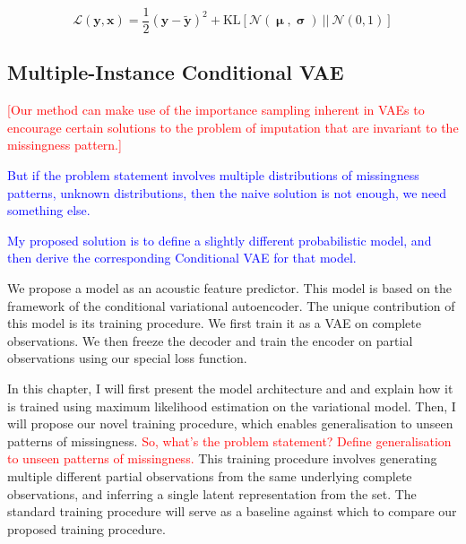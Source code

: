 \documentclass[a4paper,12pt,twoside,openright]{article}
\newcommand{\crit}[1]{\textcolor{red}{#1}}
\newcommand{\draft}[1]{\textcolor{blue}{#1}}
\begin{document}
\[
    \mathcal{L}(\mathbf{y}, \mathbf{x}) = \frac{1}{2} (\mathbf{y} - \tilde{\mathbf{y}})^2 + \mathrm{KL} [\mathcal{N}(\boldsymbol{\upmu}, \boldsymbol{\upsigma}) ~||~ \mathcal{N}(0,1)]
\]

\subsection{Multiple-Instance Conditional VAE}

\crit{[Our method can make use of the importance sampling inherent in VAEs to encourage certain solutions to the problem of imputation that are invariant to the missingness pattern.]}

\draft{But if the problem statement involves multiple distributions of missingness patterns, unknown distributions, then the naive solution is not enough, we need something else.}

\draft{My proposed solution is to define a slightly different probabilistic model, and then derive the corresponding Conditional VAE for that model.}

We propose a model as an acoustic feature predictor. This model is based on the framework of the conditional variational autoencoder. The unique contribution of this model is its training procedure. We first train it as a VAE on complete observations. We then freeze the decoder and train the encoder on partial observations using our special loss function.

In this chapter, I will first present the model architecture and and explain how it is trained using maximum likelihood estimation on the variational model.  Then, I will propose our novel training procedure, which enables generalisation to unseen patterns of missingness. \crit{So, what's the problem statement? Define generalisation to unseen patterns of missingness.} This training procedure involves generating multiple different partial observations from the same underlying complete observations, and inferring a single latent representation from the set. The standard training procedure will serve as a baseline against which to compare our proposed training procedure.


\end{document}
